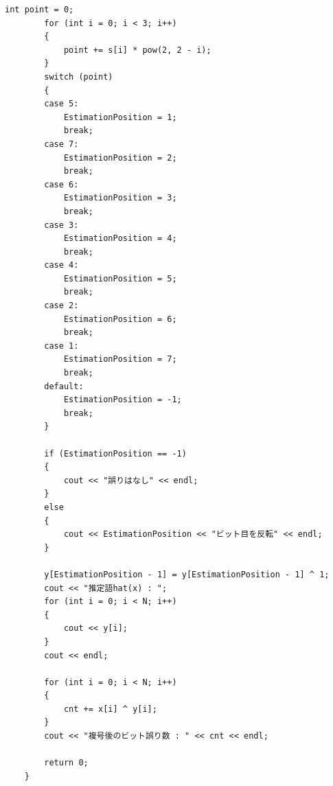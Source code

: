\documentclass[12pt]{jarticle}
\begin{document}
\begin{lstlisting}[style = lstcpp,caption=kadai3\_2.cpp]
        int point = 0;
        for (int i = 0; i < 3; i++)
        {
            point += s[i] * pow(2, 2 - i);
        }
        switch (point)
        {
        case 5:
            EstimationPosition = 1;
            break;
        case 7:
            EstimationPosition = 2;
            break;
        case 6:
            EstimationPosition = 3;
            break;
        case 3:
            EstimationPosition = 4;
            break;
        case 4:
            EstimationPosition = 5;
            break;
        case 2:
            EstimationPosition = 6;
            break;
        case 1:
            EstimationPosition = 7;
            break;
        default:
            EstimationPosition = -1;
            break;
        }
    
        if (EstimationPosition == -1)
        {
            cout << "誤りはなし" << endl;
        }
        else
        {
            cout << EstimationPosition << "ビット目を反転" << endl;
        }
    
        y[EstimationPosition - 1] = y[EstimationPosition - 1] ^ 1;
        cout << "推定語hat(x) : ";
        for (int i = 0; i < N; i++)
        {
            cout << y[i];
        }
        cout << endl;
    
        for (int i = 0; i < N; i++)
        {
            cnt += x[i] ^ y[i];
        }
        cout << "複号後のビット誤り数 : " << cnt << endl;
    
        return 0;
    }
    
\end{lstlisting}

\end{document}
